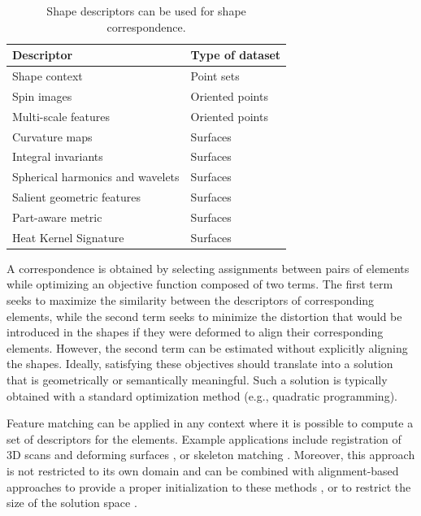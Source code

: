  \begin{table}[!hptb]
 
  \centering
  \begin{tabular}{  | l | l | }
     \hline
     Descriptor& Type of dataset  \\ \hline
     Shape context & Point sets\\ 
     Spin images & Oriented points\\ 
     Multi-scale features & Oriented points\\ 
     Curvature maps & Surfaces\\ 
     Integral invariants & Surfaces\\ 
     Spherical harmonics and wavelets & Surfaces\\
     Salient geometric features & Surfaces\\
     Part-aware metric & Surfaces\\
     Heat Kernel Signature & Surfaces\\ \hline
     
     
  \end{tabular}
  \caption{Shape descriptors can be used for shape correspondence.\label{tbl:descriptor}}

 \end{table} 
 
 
 
A correspondence is obtained by selecting assignments between pairs of elements while optimizing an objective function composed of two terms. The first term seeks to maximize the similarity between the descriptors of corresponding elements, while the second term seeks to minimize the distortion that would be introduced in the shapes if they were deformed to align their corresponding elements. However, the second term can be estimated without explicitly aligning the shapes. Ideally, satisfying these objectives should translate into a solution that is geometrically or semantically meaningful. Such a solution is typically obtained with a standard optimization method (e.g., quadratic programming).

Feature matching can be applied in any context where it is possible to compute a set of descriptors for the elements. Example applications include registration of 3D scans \citep{castellani2008sparse} and deforming surfaces \citep{anguelov2005correlated}, or skeleton matching \citep{biasotti2006sub}. Moreover, this approach is not restricted to its own domain and can be combined with alignment-based approaches to provide a proper initialization to these methods \citep{rusinkiewicz2001efficient}, or to restrict the size of the solution space \citep{gelfand2005robust,kin2010electors,chang2008automatic,aiger20084}.

